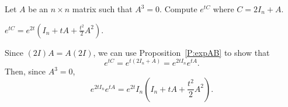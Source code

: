 \documentclass{ximera}
\begin{document}
\begin{exercise} \label{c6.3.25}
Let $A$ be an $n\times n$ matrix such that $A^3=0$.  Compute $e^{tC}$
where $C=2I_n+A$.

\begin{solution}

\ans $e^{tC} = e^{2t}(I_n + tA + \frac{t^2}{2}A^2)$.

\soln Since $(2I)A = A(2I)$, we can use Proposition~\ref{P:expAB} to
show that
\[
e^{tC} = e^{t(2I_n + A)} = e^{2tI_n}e^{tA}.
\]
Then, since $A^3 = 0$,
\[
e^{2tI_n}e^{tA} = e^{2t}I_n(I_n + tA + \frac{t^2}{2}A^2).
\]

\end{solution}
\end{exercise}
\end{document}
